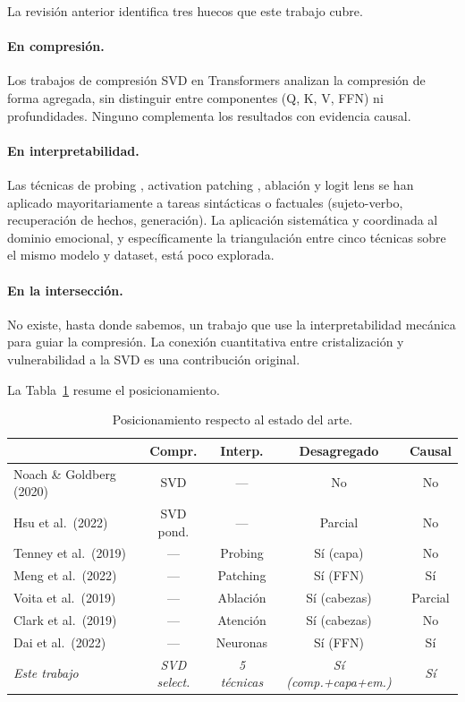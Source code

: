 La revisión anterior identifica tres huecos que este trabajo cubre.

\paragraph{En compresión.} Los trabajos de compresión SVD en Transformers
\cite{noach2020compressing, hsu2022language} analizan la compresión de forma
agregada, sin distinguir entre componentes (Q, K, V, FFN) ni profundidades.
Ninguno complementa los resultados con evidencia causal.

\paragraph{En interpretabilidad.} Las técnicas de probing
\cite{tenney2019bert}, activation patching \cite{meng2022locating}, ablación
\cite{voita2019analyzing} y logit lens \cite{nostalgebraist2020logit} se han
aplicado mayoritariamente a tareas sintácticas o factuales (sujeto-verbo,
recuperación de hechos, generación). La aplicación sistemática y coordinada al
dominio emocional, y específicamente la triangulación entre cinco técnicas
sobre el mismo modelo y dataset, está poco explorada.

\paragraph{En la intersección.} No existe, hasta donde sabemos, un trabajo que use
la interpretabilidad mecánica para guiar la compresión. La conexión cuantitativa entre
cristalización y vulnerabilidad a la SVD es una contribución original.

La Tabla~\ref{tab:posicionamiento} resume el posicionamiento.

\begin{table}[H]
    \centering
    \caption{Posicionamiento respecto al estado del arte.}
    \label{tab:posicionamiento}
    \small
    \begin{tabular}{@{}l c c c c@{}}
        \toprule
        & Compr. & Interp. & Desagregado & Causal \\
        \midrule
        Noach \& Goldberg (2020) & SVD & --- & No & No \\
        Hsu et al.\ (2022) & SVD pond. & --- & Parcial & No \\
        Tenney et al.\ (2019) & --- & Probing & Sí (capa) & No \\
        Meng et al.\ (2022) & --- & Patching & Sí (FFN) & Sí \\
        Voita et al.\ (2019) & --- & Ablación & Sí (cabezas) & Parcial \\
        Clark et al.\ (2019) & --- & Atención & Sí (cabezas) & No \\
        Dai et al.\ (2022) & --- & Neuronas & Sí (FFN) & Sí \\
        \midrule
        \textit{Este trabajo} & \textit{SVD select.} & \textit{5 técnicas} & \textit{Sí (comp.+capa+em.)} & \textit{Sí} \\
        \bottomrule
    \end{tabular}
\end{table}